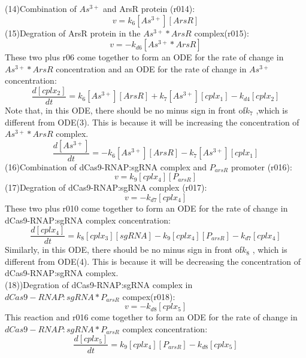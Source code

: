 (14)Combination of $As^{3+}$ and ArsR protein (r014):
\begin{displaymath}
v=k_{6}[As^{3+}][ArsR]
\end{displaymath}
(15)Degration of ArsR protein in the  $As^{3+}*ArsR$ complex(r015):
\begin{displaymath}
v=-k_{d6}[As^{3+}*ArsR]
\end{displaymath}
These two plus r06 come together to form an ODE for the rate of change in $As^{3+}*ArsR$  concentration and an ODE for the rate of change in $As^{3+}$ concentration:
\begin{equation}
\frac{d[cplx_2]}{dt}=k_{6}[As^{3+}][ArsR]+k_7[As^{3+}][cplx_1]-k_{d4}[cplx_2] \tag{6}
\end{equation}
Note that, in this ODE, there should be no minus sign in front of$k_7$ ,which is different from ODE(3). This is because it will be increasing the concentration of  $As^{3+}*ArsR$ complex.\\
\begin{equation}
\frac{d[As^{3+}]}{dt}=-k_{6}[As^{3+}][ArsR]-k_7[As^{3+}][cplx_1] \tag{7}
\end{equation}
(16)Combination of dCas9-RNAP:sgRNA complex and $P_{arsR}$ promoter (r016):
\begin{displaymath}
v=k_{9}[cplx_4][P_{arsR}]
\end{displaymath}
(17)Degration of dCas9-RNAP:sgRNA complex (r017): 
\begin{displaymath}
v=-k_{d7}[cplx_4]
\end{displaymath}
These two plus r010 come together to form an ODE for the rate of change in dCas9-RNAP:sgRNA complex concentration:
\begin{equation}
\frac{d[cplx_4]}{dt}=k_{8}[cplx_3][sgRNA]-k_{9}[cplx_4][P_{arsR}]-k_{d7}[cplx_4]\tag{8}
\end{equation}
Similarly, in this ODE, there should be no minus sign in front of$k_8$ , which is different from ODE(4). This is because it will be decreasing the concentration of dCas9-RNAP:sgRNA complex.\\
(18))Degration of dCas9-RNAP:sgRNA complex in $dCas9-RNAP:sgRNA*P_{arsR}$ compex(r018):
\begin{displaymath}
v=-k_{d8}[cplx_5]
\end{displaymath}
This reaction and r016 come together to form an ODE for the rate of change in $dCas9-RNAP:sgRNA*P_{arsR}$ complex concentration:
\begin{equation}
\frac{d[cplx_5]}{dt}=k_{9}[cplx_4][P_{arsR}]-k_{d8}[cplx_5]\tag{9}
\end{equation} 
